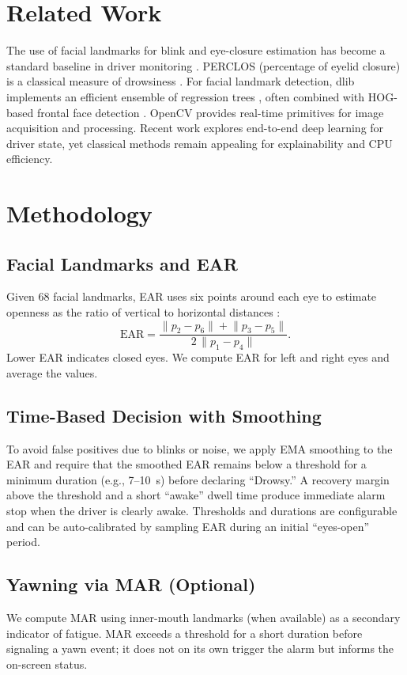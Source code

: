 \documentclass[conference]{IEEEtran}
\begin{document}
\section{Related Work}
The use of facial landmarks for blink and eye-closure estimation has become a standard baseline in driver monitoring \cite{soukupova2016}. PERCLOS (percentage of eyelid closure) is a classical measure of drowsiness \cite{perclos}. For facial landmark detection, dlib implements an efficient ensemble of regression trees \cite{kazemi2014}, often combined with HOG-based frontal face detection \cite{dalal2005}. OpenCV \cite{opencv} provides real-time primitives for image acquisition and processing. Recent work explores end-to-end deep learning for driver state, yet classical methods remain appealing for explainability and CPU efficiency.

\section{Methodology}
\subsection{Facial Landmarks and EAR}
Given 68 facial landmarks, EAR uses six points around each eye to estimate openness as the ratio of vertical to horizontal distances \cite{soukupova2016}:
\begin{equation}
\mathrm{EAR} = \frac{\lVert p_2 - p_6 \rVert + \lVert p_3 - p_5 \rVert}{2\, \lVert p_1 - p_4 \rVert}.
\end{equation}
Lower EAR indicates closed eyes. We compute EAR for left and right eyes and average the values.

\subsection{Time-Based Decision with Smoothing}
To avoid false positives due to blinks or noise, we apply EMA smoothing to the EAR and require that the smoothed EAR remains below a threshold for a minimum duration (e.g., 7--10~s) before declaring ``Drowsy.'' A recovery margin above the threshold and a short ``awake'' dwell time produce immediate alarm stop when the driver is clearly awake. Thresholds and durations are configurable and can be auto-calibrated by sampling EAR during an initial ``eyes-open'' period.

\subsection{Yawning via MAR (Optional)}
We compute MAR using inner-mouth landmarks (when available) as a secondary indicator of fatigue. MAR exceeds a threshold for a short duration before signaling a yawn event; it does not on its own trigger the alarm but informs the on-screen status.
\end{document}
